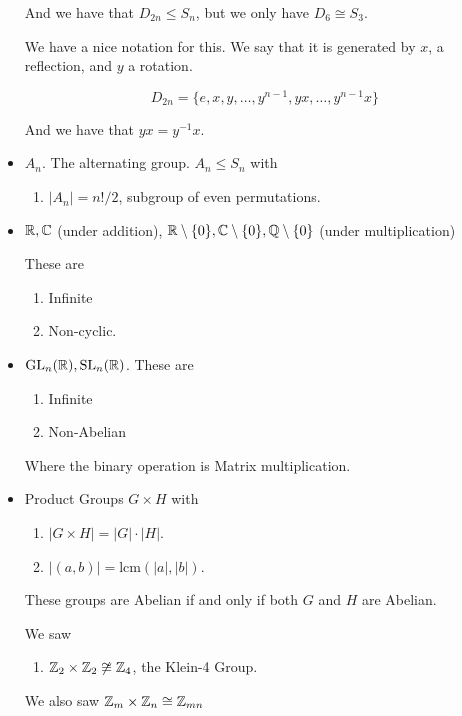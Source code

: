 \documentclass[12pt]{article}
\newcommand{\lcm}{\text{lcm}}
\def\gl{\text{GL}}
\def\sl{\text{SL}}
\begin{document}
\begin{itemize}
    And we have that $D_{2n} \le S_n$, but we only have $D_6 \cong S_3$.

    We have a nice notation for this. We say that it is generated by $x$, a
    reflection, and $y$ a rotation.

    \[
      D_{2n} = \{e, x, y, \dots, y^{n - 1}, yx, \dots, y^{n-1}x\}
    \]

    And we have that $yx = y^{-1}x$.

  \item $A_n$. The alternating group. $A_n \le S_n$ with

    \begin{enumerate}
      \item $|A_n| = n! / 2$, subgroup of even permutations.
    \end{enumerate}

  \item ${\mathbb R}, {\mathbb C}$ (under addition), ${\mathbb R} \setminus \{0\}, {\mathbb C} \setminus \{0\}, {\mathbb Q}
    \setminus \{0\}$ (under multiplication)

    These are

    \begin{enumerate}
      \item Infinite
      \item Non-cyclic.
    \end{enumerate}

  \item $\gl_n(\R), \sl_n(\R)$. These are

    \begin{enumerate}
      \item Infinite
      \item Non-Abelian
    \end{enumerate}

    Where the binary operation is Matrix multiplication.

  \item Product Groups $G \times H$ with

    \begin{enumerate}
      \item $|G \times H| = |G| \cdot |H|$.
      \item $|(a, b)| = \lcm(|a|, |b|)$.
    \end{enumerate}

    These groups are Abelian if and only if both $G$ and $H$ are Abelian.

    We saw

    \begin{enumerate}
      \item ${\mathbb Z}_2 \times {\mathbb Z}_2 \not\cong {\mathbb Z}_4$, the Klein-4 Group.
    \end{enumerate}

    We also saw ${\mathbb Z}_m \times {\mathbb Z}_n \cong {\mathbb Z}_{mn}$
\end{itemize}
\end{document}
